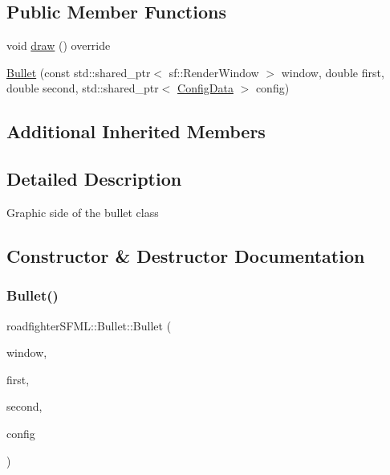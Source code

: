 \subsection*{Public Member Functions}
\begin{DoxyCompactItemize}
\item 
void \hyperlink{classroadfighterSFML_1_1Bullet_a37d6977eace695d237c8859a0bcd413c}{draw} () override
\item 
\hyperlink{classroadfighterSFML_1_1Bullet_a396d4a5f8143e8c50d41d1ee0ae4c4fb}{Bullet} (const std\+::shared\+\_\+ptr$<$ sf\+::\+Render\+Window $>$ window, double first, double second, std\+::shared\+\_\+ptr$<$ \hyperlink{classConfigData}{Config\+Data} $>$ config)
\end{DoxyCompactItemize}
\subsection*{Additional Inherited Members}


\subsection{Detailed Description}
Graphic side of the bullet class 

\subsection{Constructor \& Destructor Documentation}
\mbox{\label{classroadfighterSFML_1_1Bullet_a396d4a5f8143e8c50d41d1ee0ae4c4fb}} 
\subsubsection{\texorpdfstring{Bullet()}{Bullet()}}
{\footnotesize\ttfamily roadfighter\+S\+F\+M\+L\+::\+Bullet\+::\+Bullet (\begin{DoxyParamCaption}\item[{const std\+::shared\+\_\+ptr$<$ sf\+::\+Render\+Window $>$}]{window,  }\item[{double}]{first,  }\item[{double}]{second,  }\item[{std\+::shared\+\_\+ptr$<$ \hyperlink{classConfigData}{Config\+Data} $>$}]{config }\end{DoxyParamCaption})}

